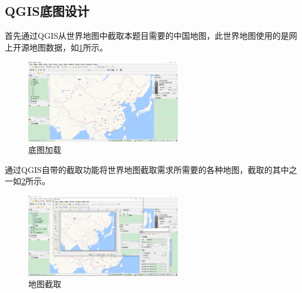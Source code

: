 \subsection{QGIS底图设计}
首先通过QGIS从世界地图中截取本题目需要的中国地图，此世界地图使用的是网上开源地图数据，如\ref{fig:ditu}所示。

\begin{figure}[!htb]%
	\centering
	\includegraphics[width=0.60\textwidth]{figs/gisditu.png}
	\caption{底图加载}
	\label{fig:ditu}
\end{figure}
通过QGIS自带的截取功能将世界地图截取需求所需要的各种地图，截取的其中之一如\ref{fig:shezhiditu}所示。
\begin{figure}[!htb]%
	\centering
	\includegraphics[width=0.60\textwidth]{figs/shezhiditu.png}
	\caption{地图截取}
	\label{fig:shezhiditu}
\end{figure}
